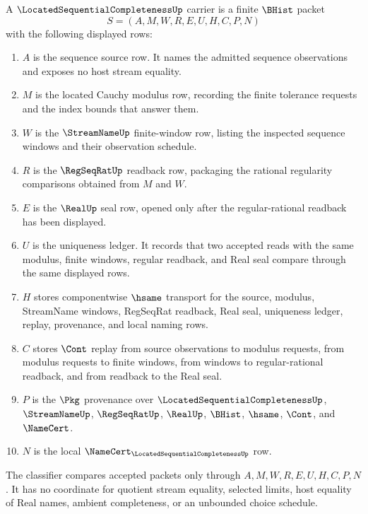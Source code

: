 \begin{definition}
\label{def:located-sequential-completeness-carrier}
A $\LocatedSequentialCompletenessUp$ carrier is a finite $\BHist$ packet
$$
S=(A,M,W,R,E,U,H,C,P,N)
$$
with the following displayed rows:
\begin{enumerate}
\item $A$ is the sequence source row. It names the admitted sequence observations and exposes no host stream equality.
\item $M$ is the located Cauchy modulus row, recording the finite tolerance requests and the index bounds that answer them.
\item $W$ is the $\StreamNameUp$ finite-window row, listing the inspected sequence windows and their observation schedule.
\item $R$ is the $\RegSeqRatUp$ readback row, packaging the rational regularity comparisons obtained from $M$ and $W$.
\item $E$ is the $\RealUp$ seal row, opened only after the regular-rational readback has been displayed.
\item $U$ is the uniqueness ledger. It records that two accepted reads with the same modulus, finite windows, regular readback, and Real seal compare through the same displayed rows.
\item $H$ stores componentwise $\hsame$ transport for the source, modulus, StreamName windows, RegSeqRat readback, Real seal, uniqueness ledger, replay, provenance, and local naming rows.
\item $C$ stores $\Cont$ replay from source observations to modulus requests, from modulus requests to finite windows, from windows to regular-rational readback, and from readback to the Real seal.
\item $P$ is the $\Pkg$ provenance over $\LocatedSequentialCompletenessUp$, $\StreamNameUp$, $\RegSeqRatUp$, $\RealUp$, $\BHist$, $\hsame$, $\Cont$, and $\NameCert$.
\item $N$ is the local $\NameCert_{\LocatedSequentialCompletenessUp}$ row.
\end{enumerate}
The classifier compares accepted packets only through $A,M,W,R,E,U,H,C,P,N$. It has no coordinate for quotient stream equality, selected limits, host equality of Real names, ambient completeness, or an unbounded choice schedule.
\end{definition}

